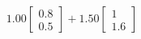 \documentclass[preview]{standalone}
\begin{document}
\begin{align*}
1.00 \begin{bmatrix} 0.8 \\ 0.5 \end{bmatrix} + 1.50 \begin{bmatrix} 1 \\ 1.6 \end{bmatrix}
\end{align*}
\end{document}
